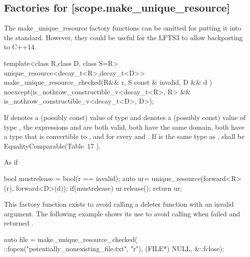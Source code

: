 \documentclass[ebook,11pt,article]{memoir}
\begin{document}
\subsection {Factories for  [scope.make_unique_resource]}

\begin{note}
The make_unique_resource factory functions can be omitted for putting it into the standard. However, they could be useful for the LFTS3 to allow backporting to C++14.
\end{note}



\begin{itemdecl}
template<class R,class D, class S=R>
unique_resource<decay_t<R>,decay_t<D>>
make_unique_resource_checked(R&& r, S const & invalid, D && d ) 
noexcept(is_nothrow_constructible_v<decay_t<R>, R> &&
         is_nothrow_constructible_v<decay_t<D>, D>);
\end{itemdecl}

\begin{itemdescr}
\pnum
\requires 
If  denotes a (possibly const) value of type  and  denotes a
(possibly const) value of type , the expressions  and 
are both valid, both have the same domain, both have a type that is
convertible to , and  for every  and
. If  is the same type as ,  shall be EqualityComparable(Table~17
). 

\pnum
\effects As if
\begin{codeblock}
  bool mustrelease = bool(r == invalid);
  auto ur= unique_resource(forward<R>(r), forward<D>(d));
  if(mustrelease) ur.release();
  return ur;
\end{codeblock}

\pnum
\begin{note}
This factory function exists to avoid calling a deleter function with an invalid argument. The following example shows its use to avoid calling  when  failed and returned .
\end{note}

\pnum
\begin{example}
\begin{codeblock}
		auto file = make_unique_resource_checked(
		      ::fopen("potentially_nonexisting_file.txt", "r"), 
		      (FILE*) NULL, &::fclose);
\end{codeblock}
\end{example}


\end{itemdescr}
\end{document}

